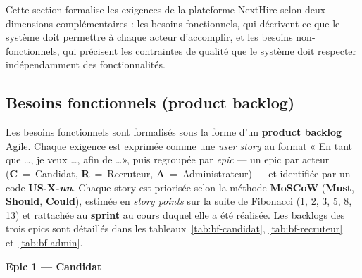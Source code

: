 Cette section formalise les exigences de la plateforme NextHire selon deux dimensions complémentaires : les besoins fonctionnels, qui décrivent ce que le système doit permettre à chaque acteur d'accomplir, et les besoins non-fonctionnels, qui précisent les contraintes de qualité que le système doit respecter indépendamment des fonctionnalités.

\subsection{Besoins fonctionnels (product backlog)}

Les besoins fonctionnels sont formalisés sous la forme d'un \textbf{product backlog} Agile. Chaque exigence est exprimée comme une \textit{user story} au format « En tant que \dots, je veux \dots, afin de \dots », puis regroupée par \textit{epic} --- un epic par acteur (\textbf{C}~=~Candidat, \textbf{R}~=~Recruteur, \textbf{A}~=~Administrateur) --- et identifiée par un code \textbf{US-X-\textit{nn}}. Chaque story est priorisée selon la méthode \textbf{MoSCoW} (\textbf{Must}, \textbf{Should}, \textbf{Could}), estimée en \textit{story points} sur la suite de Fibonacci (1, 2, 3, 5, 8, 13) et rattachée au \textbf{sprint} au cours duquel elle a été réalisée. Les backlogs des trois epics sont détaillés dans les tableaux~\ref{tab:bf-candidat}, \ref{tab:bf-recruteur} et~\ref{tab:bf-admin}.

\bigskip
\noindent\textbf{Epic 1 --- Candidat}

